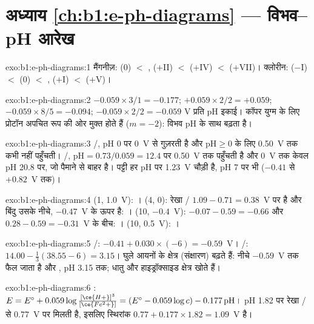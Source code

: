 \section*{अध्याय \ref{ch:b1:e-ph-diagrams} --- विभव--pH आरेख}

\begin{solution}{exo:b1:e-ph-diagrams:1}
मैंगनीज़:  (0) $<$ ,  ($+$II) $<$ 
($+$IV) $<$  ($+$VII)। क्लोरीन:  ($-$I) $<$  (0)
$<$ ,  ($+$I) $<$  ($+$V)।
\end{solution}

\begin{solution}{exo:b1:e-ph-diagrams:2}
$-0.059 \times 3/1 = -0.177$; $+0.059 \times 2/2 = +0.059$;
$-0.059 \times 8/5 = -0.094$; $-0.059 \times 2/2 = -0.059$ V प्रति pH इकाई।
कॉपर युग्म के लिए प्रोटॉन अपचित रूप की ओर मुक्त होते हैं
($m = -2$): विभव pH के साथ बढ़ता है।
\end{solution}

\begin{solution}{exo:b1:e-ph-diagrams:3}
/, pH 0 पर 0~V से गुज़रती है और $\mathrm{pH} \geqslant 0$ के लिए
0.50~V तक कभी नहीं पहुँचती। /,
$\mathrm{pH} = 0.73/0.059 = 12.4$ पर 0.50~V तक पहुँचती है और 0~V तक केवल pH 20.8 पर, जो
पैमाने से बाहर है। पट्टी हर pH पर \qty{1.23}{V} चौड़ी है, pH 7 पर भी
($-0.41$ से $+0.82$~V तक)।
\end{solution}

\begin{solution}{exo:b1:e-ph-diagrams:4}
(1, 1.0~V): । (4, 0): रेखा /
$1.09 - 0.71 = 0.38$~V पर है और बिंदु उसके नीचे, $-0.47$~V के ऊपर है:
। (10, $-0.4$~V): $-0.07 - 0.59 = -0.66$ और $0.28 -
0.59 = -0.31$~V के बीच: । (10, 0.5~V): ।
\end{solution}

\begin{solution}{exo:b1:e-ph-diagrams:5}
/: $-0.41 + 0.030 \times (-6) = -0.59$~V।
/: $14.00 - \frac13(38.55 - 6) = 3.15$। घुले आयनों के
क्षेत्र (संक्षारण) बढ़ते हैं:  नीचे $-0.59$~V तक फैल जाता है
और , pH 3.15 तक; धातु और हाइड्रॉक्साइड क्षेत्र खोते हैं।
\end{solution}

\begin{solution}{exo:b1:e-ph-diagrams:6}
: $E = E^\circ + 0.059\log\frac{[\ce{H+}]^3}{[\ce{Fe^2+}]}
= (E^\circ - 0.059\log c) - 0.177\,\mathrm{pH}$। pH 1.82 पर रेखा
/ से 0.77~V पर मिलती है, इसलिए स्थिरांक $0.77 + 0.177 \times 1.82
= 1.09$~V है।
\end{solution}

